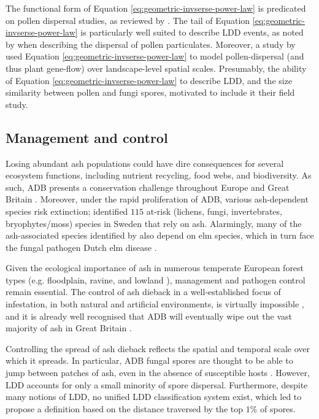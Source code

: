 The functional form of Equation \ref{eq:geometric-invserse-power-law} is predicated on pollen dispersal studies,
as reviewed by \cite{nathan2012dispersal}. The tail of Equation \ref{eq:geometric-invserse-power-law} is 
particularly well suited to describe LDD events, as noted by \cite{https://doi.org/10.1111/j.1365-294X.2004.02100.x}
when describing the dispersal of pollen particulates. Moreover, a study by \cite{https://doi.org/10.1111/j.1365-294X.2006.03155.x}
used Equation \ref{eq:geometric-invserse-power-law} to model pollen-dispersal (and thus plant gene-flow) over landscape-level spatial scales. 
Presumably, the ability of Equation \ref{eq:geometric-invserse-power-law} to describe LDD, and the size similarity between pollen and fungi spores, 
motivated \cite{grosdidier2018tracking} to include it their field study. 

\newpage

\subsection{Management and control}

Losing abundant ash populations could have dire consequences for several ecosystem functions, 
including nutrient recycling, food webs, and biodiversity.
As such, ADB presents a conservation challenge throughout Europe and Great Britain \cite{pautasso2013european}.
Moreover, under the rapid proliferation of ADB, various ash-dependent species risk extinction;
\cite{hultberg2020ash} identified $115$ at-risk (lichens, fungi, invertebrates, bryophytes/moss) species in Sweden that rely on ash.
Alarmingly, many of the ash-associated species identified by \cite{hultberg2020ash} also depend on elm species, which in turn face 
the fungal pathogen Dutch elm disease \cite{brasier1991ophiostoma}.

Given the ecological importance of ash in numerous temperate European forest types (e.g. floodplain, ravine, 
and lowland \cite{dobrowolska2011review}), management and pathogen control remain essential. The control of ash dieback
in a well-established focus of infestation, in both natural and artificial environments, is virtually impossible
\cite{havrdova2017environmental}, and it is already well recognised that ADB will eventually wipe out the vast 
majority of ash in Great Britain \cite{ash-dieback-costs}.

Controlling the spread of ash dieback reflects the spatial and temporal scale over which it spreads.
In particular, ADB fungal spores are thought to be able to jump between patches of ash,
even in the absence of susceptible hosts \cite{wingen2013long}.
However, LDD accounts for only a small minority of spore dispersal.
Furthermore, despite many notions of LDD, no unified LDD classification system exist, 
which led \cite{golan2017long} to propose a definition based on the distance traversed by the top $1\%$ of spores.

